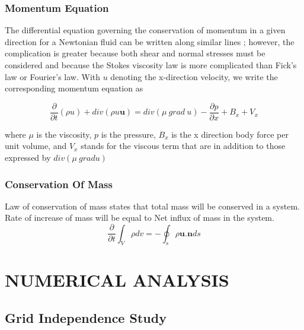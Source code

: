  
 \subsection{Momentum Equation}
 
 The differential equation governing the conservation of momentum in a given direction for a Newtonian fluid can be written along similar lines ; however, the complication is greater because both shear and normal stresses must be considered and because the Stokes viscosity law is more complicated than Fick's law or Fourier's law. With $u$ denoting the x-direction velocity, we write the corresponding momentum equation as 
 
 \begin{equation}
 \dfrac{\partial}{\partial t}(\rho u) + div(\rho u \textbf{u}) =  div(\mu \ grad \ u) - \dfrac{\partial p}{\partial x} + B_x + V_x
 \end{equation}  
 
 where $\mu$ is the viscosity, $p$ is the pressure, $B_x$ is the x direction body force per unit volume, and $V_x$ stands for the viscous term that are in addition to those expressed by $div(\mu \ grad u)$
 
 \subsection{Conservation Of Mass}
 
 Law of conservation of mass states that total mass will be conserved in a system. Rate of increase of mass will be equal to Net influx of mass in the system.
  \begin{equation} 
  \frac{\partial}{\partial t}\int_V \rho dv = - \oint_s \rho \textbf{u}.\textbf{n} ds 
  \end{equation}
 
 \chapter{NUMERICAL ANALYSIS}
 
 
 
 
 


\section{Grid Independence Study}

